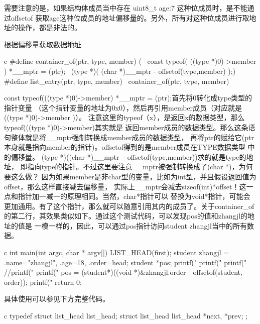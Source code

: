 \begin{outline}[enumerate]
需要注意的是，如果结构体成员当中存在 uint8\_t age:7 这种位成员时，是不能通过offsetof
获取age这种位成员的地址偏移量的。另外，所有对这种位成员进行取地址的操作，都是非法的。

\1 根据偏移量获取数据地址
\begin{code-in-enumerate}{c}
#define container_of(ptr, type, member) ({                           \
        const typeof( ((type *)0)->member ) *__mptr = (ptr);         \
        (type *)( (char *)__mptr - offsetof(type,member) );})
#define list_entry(ptr, type, member)                                \
        container_of(ptr, type, member)
\end{code-in-enumerate}

const typeof(((type *)0)->member) *\_\_mptr = (ptr);首先将0转化成type类型的指针变量
（这个指针变量的地址为0x0），然后再引用member成员（对应就是((type *)0)->member )）。
注意这里的typeof（x），是返回x的数据类型，那么 typeof(((type *)0)->member)其实就是
返回member成员的数据类型。那么这条语句整体就是将\_\_mptr强制转换成member成员的数据类型，
再将ptr的赋给它(ptr本身就是指向member的指针)。offsetof得到的是member成员在TYPE数据类型
中的偏移量。 (type *)((char *)\_\_mptr – offsetof(type,member))求的就是type的地址，
即指向type的指针。不过这里要注意\_\_mptr被强制转换成了(char *)，为何要这么做？
因为如果member是非char型的变量，比如为int型，并且假设返回值为offset，那么这样直接减去偏移量，
实际上\_\_mptr会减去sizeof(int)*offset！这一点和指针加一减一的原理相同。当然，char*指针可以
替换为void*指针，可能会更加通用。有了这个指针，那么就可以随意引用其内的成员了。关于container\_of
的第二行，其效果类似如下。通过这个测试代码，可以发现pos的值和zhangjl的地址的值是
一模一样的，因此，可以通过pos指针访问student zhangjl当中的所有数据。
\begin{code-in-enumerate}{c}
int main(int argc, char * argv[])
{
        LIST_HEAD(first);
        student zhangjl = {.name="zhangjl", .age=18, .order=head};
        student *pos;
        printf("%
        printf("%
        printf("%
        //printf("%
        printf("%
        pos = (student*)((void *)&zhangjl.order - offsetof(student, order));
        printf("%
        return 0;
}
\end{code-in-enumerate}

具体使用可以参见下方完整代码。
\begin{code-in-enumerate}{c}
typedef struct list_head list_head;
struct list_head {
        list_head *next, *prev;
};


\end{code-in-enumerate}
\end{outline}
